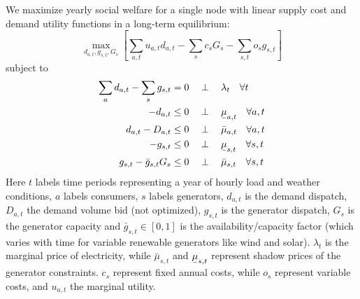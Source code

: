 \documentclass[final,3p,times]{elsarticle}
\def\l{\lambda} \def\K{\kappa} \def\m{\mu} \def\G{\Gamma} \def\d{\partial}
\begin{document}
We maximize yearly social welfare for a single node with linear supply cost and
demand utility functions in a long-term equilibrium:
\begin{equation}
  \max_{d_{a,t}, g_{s,t}, G_s}\left[\sum_{a,t} u_{a,t} d_{a,t} -  \sum_s c_s G_s - \sum_{s,t} o_{s} g_{s,t}\right]  \label{eq:objl}
\end{equation}
subject to
\begin{align}
  \sum_a d_{a,t} - \sum_s g_{s,t} & =  0 \hspace{0.34cm}\perp \hspace{0.34cm} \l_t \hspace{0.34cm} \forall t \label{eq:balance} \\
  -d_{a,t}                        & \leq 0 \hspace{0.34cm}\perp \hspace{0.34cm} \ubar{\mu}_{a,t} \hspace{0.34cm} \forall a,t    \\
  d_{a,t} - D_{a,t}               & \leq 0 \hspace{0.34cm}\perp \hspace{0.34cm} \bar{\mu}_{a,t} \hspace{0.34cm} \forall a,t     \\
  -g_{s,t}                        & \leq 0 \hspace{0.34cm}\perp \hspace{0.34cm} \ubar{\mu}_{s,t} \hspace{0.34cm} \forall s,t    \\
  g_{s,t} - \bar{g}_{s,t} G_s     & \leq 0 \hspace{0.34cm}\perp \hspace{0.34cm} \bar{\mu}_{s,t} \hspace{0.34cm} \forall s,t
\end{align}
Here $t$ labels time periods representing a year of hourly load and weather conditions,
$a$ labels consumers, $s$ labels generators, $d_{a,t}$ is the demand dispatch,
$D_{a,t}$ the demand volume bid (not optimized), $g_{s,t}$ is the generator
dispatch, $G_s$ is the generator capacity and $\bar{g}_{s,t}\in[0,1]$ is the
availability/capacity factor (which varies with time for variable renewable
generators like wind and solar). $\l_t$ is the marginal price of electricity,
while $\bar{\mu}_{s,t}$ and $\ubar{\mu}_{s,t}$ represent shadow prices of the
generator constraints. $c_s$ represent fixed annual costs, while $o_s$ represent
variable costs, and $u_{a,t}$ the marginal utility.
\end{document}
